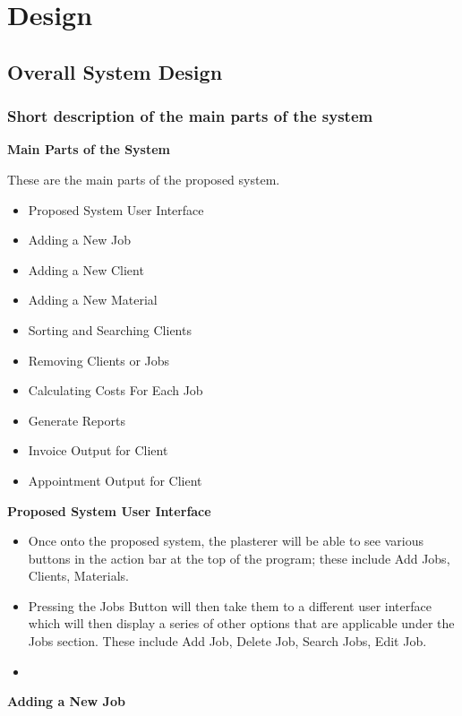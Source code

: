 \chapter{Design}

\section{Overall System Design}

\subsection{Short description of the main parts of the system}

\begin{flushleft}
\textbf{Main Parts of the System}
 \\ \par These are the main parts of the proposed system.
	\begin{itemize}
			\item Proposed System User Interface
			\item Adding a New Job
			\item Adding a New Client
			\item Adding a New Material
			\item Sorting and Searching Clients
			\item Removing Clients or Jobs
			\item Calculating Costs For Each Job
			\item Generate Reports
			\item Invoice Output for Client
			\item Appointment Output for Client
	\end{itemize}

\end{flushleft}


\textbf{Proposed System User Interface}
	\begin{itemize}
		\item Once onto the proposed system, the plasterer will be able to see various buttons in the action bar at the top of the program; these include Add
Jobs, Clients, Materials.
		\item Pressing the Jobs Button will then take them to a different user interface which will then display a series of other options that are applicable under the Jobs section. These include Add Job, Delete Job, Search Jobs, Edit Job. 
		\item 
	\end{itemize}
\textbf{Adding a New Job}

